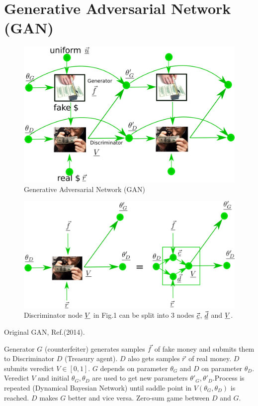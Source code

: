 \chapter{Generative Adversarial Network (GAN)}
\begin{refsection}

\begin{figure}[h!]\label{fig-gan}
\centering
\includegraphics[width=6in]{gan/gan.png}
\caption{Generative Adversarial  Network (GAN)} 
\end{figure}

\begin{figure}[h!]\label{fig-gan-detail}
\centering
\includegraphics[width=6in]{gan/gan-detail.png}
\caption{Discriminator node $\underline{V}$ in Fig.1 can be
split into 3 nodes $\vec{{\underline{c}}}$, $\vec{{\underline{d}}}$ and $\underline{V}$.} 
\end{figure}

Original GAN, 
Ref.\cite{gf2014}(2014). 

Generator $G$ (counterfeiter) generates samples ${\vec{f}}$ of fake money and submits them to Discriminator $D$ (Treasury agent). $D$ also gets samples ${\vec{r}}$ of real money. $D$ submits veredict $V\in [0,1]$. $G$ depends on parameter $\theta_G$ and $D$ on parameter $\theta_D$. Veredict $V$ and initial $\theta_G, \theta_D$ are used to get new parameters $\theta'_G, \theta'_D$.Process is repeated (Dynamical Bayesian Network) until saddle point in $V(\theta_G, \theta_D)$ is reached. $D$ makes $G$ better and vice versa.  Zero-sum game between $D$ and $G$.




\end{refsection}
